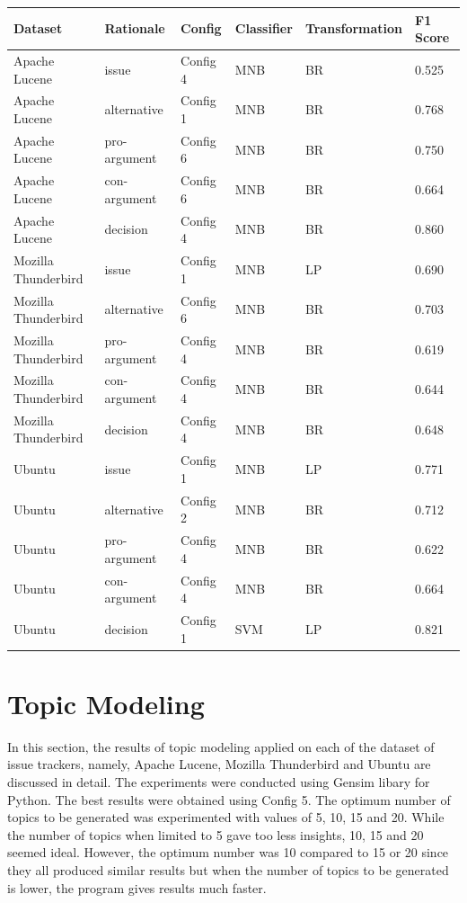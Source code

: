 \documentclass[a4paper,12pt,twoside]{report}
\begin{document}
\begin{table} %
    \centering
    \begin{adjustbox}{max width=\columnwidth}
    \def\arraystretch{1} %
    \begin{tabular}{p{4cm} p{3cm} p{2cm} p{2cm} p{3cm} p{3cm}}
        \toprule
        \textbf{Dataset} & \textbf{Rationale} & \textbf{Config} & \textbf{Classifier} & \textbf{Transformation} & \textbf{F1 Score}\\
        \midrule
			Apache Lucene & issue & Config 4 & MNB & BR & 0.525 \\
			Apache Lucene & alternative & Config 1 & MNB & BR & 0.768 \\
			Apache Lucene & pro-argument & Config 6 & MNB & BR & 0.750 \\
			Apache Lucene & con-argument & Config 6 & MNB & BR & 0.664 \\
			Apache Lucene & decision & Config 4 & MNB & BR & 0.860 \\
		\midrule
			Mozilla Thunderbird & issue & Config 1 & MNB & LP & 0.690 \\ 
			Mozilla Thunderbird & alternative & Config 6 & MNB & BR & 0.703 \\ 
			Mozilla Thunderbird & pro-argument & Config 4 & MNB & BR & 0.619 \\ 
			Mozilla Thunderbird & con-argument & Config 4 & MNB & BR & 0.644 \\ 			
			Mozilla Thunderbird & decision & Config 4 & MNB & BR & 0.648 \\ 
		\midrule
			Ubuntu & issue & Config 1 & MNB & LP & 0.771 \\
			Ubuntu & alternative & Config 2 & MNB & BR & 0.712 \\
			Ubuntu & pro-argument & Config 4 & MNB & BR & 0.622 \\
			Ubuntu & con-argument & Config 4 & MNB & BR & 0.664 \\
			Ubuntu & decision & Config 1 & SVM & LP & 0.821 \\
        \midrule
    \end{tabular}
    \end{adjustbox}
    \label{tab:summaryFGC}
\end{table}

\section{Topic Modeling}
In this section, the results of topic modeling applied on each of the dataset of issue trackers, namely, Apache Lucene, Mozilla Thunderbird and Ubuntu are discussed in detail. The experiments were conducted using Gensim libary for Python. The best results were obtained using Config 5. The optimum number of topics to be generated was experimented with values of 5, 10, 15 and 20. While the number of topics when limited to 5 gave too less insights, 10, 15 and 20 seemed ideal. However, the optimum number was 10 compared to 15 or 20 since they all produced similar results but when the number of topics to be generated is lower, the program gives results much faster.
\end{document}
